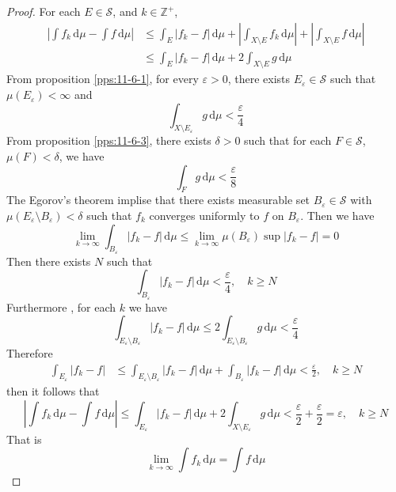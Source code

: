 \documentclass[../main.tex]{subfiles}
\begin{document}
\begin{proof}
   For each \(  E\in \mathcal{S}  \), and \(  k\in \mathbb{Z} ^{+ }  \),    \[
    \begin{aligned}
    \left| \int f_{k}\,\mathrm{d} \mu -\int f\,\mathrm{d} \mu  \right|&\le  \int_{E} \left| f_{k}-f \right|\,\mathrm{d} \mu     + \left|  \int_{X\setminus E}f_{k}\,\mathrm{d} \mu  \right| +  \left| \int_{X\setminus E}f\,\mathrm{d} \mu  \right| \\ 
     &\le \int_{E}\left| f_{k}-f \right|\,\mathrm{d} \mu + 2 \int_{X\setminus E} g\,\mathrm{d} \mu  
    \end{aligned}
    \]  From proposition \ref{pps:11-6-1}, for every \(   \varepsilon > 0  \), there exists \(  E_{ \varepsilon }\in \mathcal{S}  \) such that \(  \mu \left( E_{ \varepsilon } \right)< \infty   \) and \[
    \int_{X\setminus E_{ \varepsilon }} g\,\mathrm{d} \mu < \frac{ \varepsilon  }{4 } 
    \] From proposition \ref{pps:11-6-3}, there exists \(   \delta > 0  \) such that for each \(  F\in \mathcal{S}  \), \(  \mu \left( F \right)<  \delta    \), we have \[
    \int_{F}g\,\mathrm{d} \mu < \frac{ \varepsilon  }{8 } 
    \]     The Egorov's theorem implise that there exists measurable set \(  B_{ \varepsilon }\in \mathcal{S}  \) with \(  \mu \left( E_{ \varepsilon }\setminus B_{ \varepsilon } \right)<  \delta  \) such that  \(  f_{k}  \) converges uniformly to \(  f  \) on \(  B_{ \varepsilon }  \). Then we have \[
\lim_{k\to \infty}    \int_{B_{ \varepsilon }}\left| f_{k}-f \right| \,\mathrm{d} \mu \le \lim_{k\to \infty}\mu \left( B_{ \varepsilon } \right)\sup \left| f_{k}-f \right|= 0  
    \]  Then there exists \(  N  \) such that  \[
    \int_{B_{ \varepsilon }}\left| f_{k}-f \right|\,\mathrm{d} \mu < \frac{ \varepsilon  }{4 }  ,\quad k\ge N
    \]Furthermore   , for each \(  k  \) we have   \[
    \int_{E_{ \varepsilon }\setminus B_{ \varepsilon }}\left| f_{k} -f\right|\,\mathrm{d} \mu \le 2 \int_{E_{ \varepsilon }\setminus B_{ \varepsilon }}g\,\mathrm{d} \mu< \frac{ \varepsilon  }{4 }   
    \] Therefore \[
   \begin{aligned}
    \int_{E_{ \varepsilon }}\left| f_{k}-f \right|&\le \int_{E_{ \varepsilon }\setminus B_{ \varepsilon }}\left| f_{k}-f \right|\,\mathrm{d} \mu +  \int_{B_{ \varepsilon }}\left| f_{k}-f \right|\,\mathrm{d} \mu < \frac{ \varepsilon  }{2 }    ,\quad k\ge N
   \end{aligned} 
    \] then it follows that \[
    \left| \int f_{k}\,\mathrm{d} \mu -\int f\,\mathrm{d} \mu  \right| \le \int_{E_{ \varepsilon }}\left| f_{k}-f \right|\,\mathrm{d} \mu + 2\int_{X\setminus E_{ \varepsilon }}g\,\mathrm{d} \mu < \frac{ \varepsilon  }{2 }+ \frac{ \varepsilon  }{2 }=  \varepsilon,\quad k\ge N   
    \]That is \[
    \lim_{k\to \infty} \int f_{k}\,\mathrm{d} \mu =  \int f\,\mathrm{d} \mu 
    \]
\end{proof}
\end{document}
